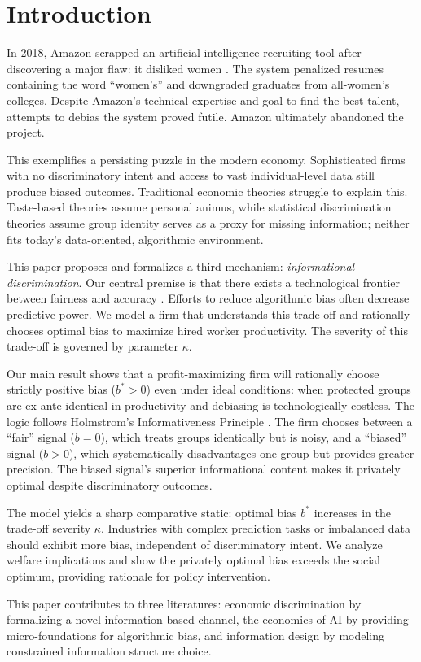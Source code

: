 \section{Introduction}

In 2018, Amazon scrapped an artificial intelligence recruiting tool after discovering a major flaw: it disliked women \citet{Dastin2018}. The system penalized resumes containing the word ``women's'' and downgraded graduates from all-women's colleges. Despite Amazon's technical expertise and goal to find the best talent, attempts to debias the system proved futile. Amazon ultimately abandoned the project.

This exemplifies a persisting puzzle in the modern economy. Sophisticated firms with no discriminatory intent and access to vast individual-level data still produce biased outcomes. Traditional economic theories struggle to explain this. Taste-based theories \citet{Becker1957} assume personal animus, while statistical discrimination theories \citet{Phelps1972,Arrow1973} assume group identity serves as a proxy for missing information; neither fits today's data-oriented, algorithmic environment.

This paper proposes and formalizes a third mechanism: \textit{informational discrimination}. Our central premise is that there exists a technological frontier between fairness and accuracy \citet{Kleinberg2017,Chouldechova2017}. Efforts to reduce algorithmic bias often decrease predictive power. We model a firm that understands this trade-off and rationally chooses optimal bias to maximize hired worker productivity. The severity of this trade-off is governed by parameter $\kappa$.

Our main result shows that a profit-maximizing firm will rationally choose strictly positive bias ($b^* > 0$) even under ideal conditions: when protected groups are ex-ante identical in productivity and debiasing is technologically costless. The logic follows Holmstrom's Informativeness Principle \citet{Holmstrom1979}. The firm chooses between a ``fair'' signal ($b=0$), which treats groups identically but is noisy, and a ``biased'' signal ($b>0$), which systematically disadvantages one group but provides greater precision. The biased signal's superior informational content makes it privately optimal despite discriminatory outcomes.

The model yields a sharp comparative static: optimal bias $b^*$ increases in the trade-off severity $\kappa$. Industries with complex prediction tasks or imbalanced data should exhibit more bias, independent of discriminatory intent. We analyze welfare implications and show the privately optimal bias exceeds the social optimum, providing rationale for policy intervention.

This paper contributes to three literatures: economic discrimination by formalizing a novel information-based channel, the economics of AI by providing micro-foundations for algorithmic bias, and information design \citet{Kamenica2011,Bergemann2019} by modeling constrained information structure choice.
